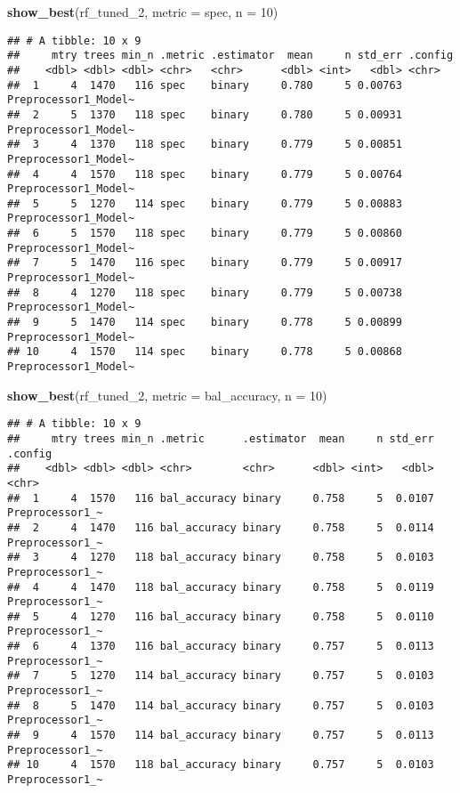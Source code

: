 \documentclass[
]{article}
\newenvironment{Shaded}{\begin{snugshade}}{\end{snugshade}}
\newcommand{\AttributeTok}[1]{\textcolor[rgb]{0.13,0.29,0.53}{#1}}
\newcommand{\DecValTok}[1]{\textcolor[rgb]{0.00,0.00,0.81}{#1}}
\newcommand{\FunctionTok}[1]{\textcolor[rgb]{0.13,0.29,0.53}{\textbf{#1}}}
\newcommand{\NormalTok}[1]{#1}
\newcommand{\StringTok}[1]{\textcolor[rgb]{0.31,0.60,0.02}{#1}}
\begin{document}
\begin{Shaded}
\begin{Highlighting}[]
\FunctionTok{show\_best}\NormalTok{(rf\_tuned\_2, }\AttributeTok{metric =} \StringTok{\textquotesingle{}spec\textquotesingle{}}\NormalTok{, }\AttributeTok{n =} \DecValTok{10}\NormalTok{)}
\end{Highlighting}
\end{Shaded}

\begin{verbatim}
## # A tibble: 10 x 9
##     mtry trees min_n .metric .estimator  mean     n std_err .config             
##    <dbl> <dbl> <dbl> <chr>   <chr>      <dbl> <int>   <dbl> <chr>               
##  1     4  1470   116 spec    binary     0.780     5 0.00763 Preprocessor1_Model~
##  2     5  1370   118 spec    binary     0.780     5 0.00931 Preprocessor1_Model~
##  3     4  1370   118 spec    binary     0.779     5 0.00851 Preprocessor1_Model~
##  4     4  1570   118 spec    binary     0.779     5 0.00764 Preprocessor1_Model~
##  5     5  1270   114 spec    binary     0.779     5 0.00883 Preprocessor1_Model~
##  6     5  1570   118 spec    binary     0.779     5 0.00860 Preprocessor1_Model~
##  7     5  1470   116 spec    binary     0.779     5 0.00917 Preprocessor1_Model~
##  8     4  1270   118 spec    binary     0.779     5 0.00738 Preprocessor1_Model~
##  9     5  1470   114 spec    binary     0.778     5 0.00899 Preprocessor1_Model~
## 10     4  1570   114 spec    binary     0.778     5 0.00868 Preprocessor1_Model~
\end{verbatim}

\begin{Shaded}
\begin{Highlighting}[]
\FunctionTok{show\_best}\NormalTok{(rf\_tuned\_2, }\AttributeTok{metric =} \StringTok{\textquotesingle{}bal\_accuracy\textquotesingle{}}\NormalTok{, }\AttributeTok{n =} \DecValTok{10}\NormalTok{)}
\end{Highlighting}
\end{Shaded}

\begin{verbatim}
## # A tibble: 10 x 9
##     mtry trees min_n .metric      .estimator  mean     n std_err .config        
##    <dbl> <dbl> <dbl> <chr>        <chr>      <dbl> <int>   <dbl> <chr>          
##  1     4  1570   116 bal_accuracy binary     0.758     5  0.0107 Preprocessor1_~
##  2     4  1470   116 bal_accuracy binary     0.758     5  0.0114 Preprocessor1_~
##  3     4  1270   118 bal_accuracy binary     0.758     5  0.0103 Preprocessor1_~
##  4     4  1470   118 bal_accuracy binary     0.758     5  0.0119 Preprocessor1_~
##  5     4  1270   116 bal_accuracy binary     0.758     5  0.0110 Preprocessor1_~
##  6     4  1370   116 bal_accuracy binary     0.757     5  0.0113 Preprocessor1_~
##  7     5  1270   114 bal_accuracy binary     0.757     5  0.0103 Preprocessor1_~
##  8     5  1470   114 bal_accuracy binary     0.757     5  0.0103 Preprocessor1_~
##  9     4  1570   114 bal_accuracy binary     0.757     5  0.0113 Preprocessor1_~
## 10     4  1570   118 bal_accuracy binary     0.757     5  0.0103 Preprocessor1_~
\end{verbatim}
\end{document}
